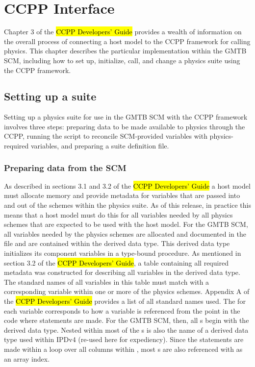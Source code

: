 \chapter{CCPP Interface}
\label{chapter: ccpp_interface}
\setlength{\parskip}{12pt}

Chapter 3 of the \hl{CCPP Developers' Guide} provides a wealth of information on the overall process of connecting a host model to the CCPP framework for calling physics. This chapter describes the particular implementation within the GMTB SCM, including how to set up, initialize, call, and change a physics suite using the CCPP framework.

\section{Setting up a suite}

Setting up a physics suite for use in the GMTB SCM with the CCPP framework involves three steps: preparing data to be made available to physics through the CCPP, running the  script to reconcile SCM-provided variables with physics-required variables, and preparing a suite definition file.

\subsection{Preparing data from the SCM}

As described in sections 3.1 and 3.2 of the \hl{CCPP Developers' Guide} a host model must allocate memory and provide metadata for variables that are passed into and out of the schemes within the physics suite. As of this release, in practice this means that a host model must do this for all variables needed by all physics schemes that are expected to be used with the host model. For the GMTB SCM, all variables needed by the physics schemes are allocated and documented in the file  and are contained within the  derived data type. This derived data type initializes its component variables in a  type-bound procedure. As mentioned in section 3.2 of the \hl{CCPP Developers' Guide}, a table containing all required metadata was constructed for describing all variables in the  derived data type. The standard names of all variables in this table must match with a corresponding variable within one or more of the physics schemes. Appendix A of the \hl{CCPP Developers' Guide} provides a list of all standard names used. The  for each variable corresponds to how a variable is referenced from the point in the code where  statements are made. For the GMTB SCM, then, all s begin with the  derived data type. Nested within most of the s is also the name of a derived data type used within IPDv4 (re-used here for expediency). Since the  statements are made within a loop over all columns within , most s are also referenced with  as an array index.

